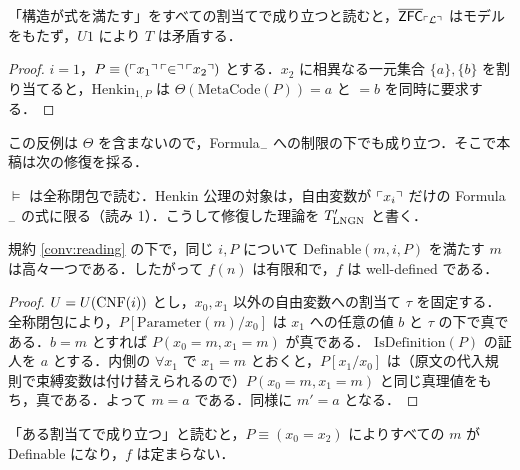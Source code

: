 \begin{proposition}\label{prop:henkin}
「構造が式を満たす」をすべての割当てで成り立つと読むと，$\overline{\mathsf{ZFC}}_{\ulcorner\mathcal{L}\urcorner}$ はモデルをもたず，$U1$ により $T$ は矛盾する．
\end{proposition}
\begin{proof}
$i=1$，$P\equiv(\ulcorner x_1\urcorner\,\ulcorner \in\urcorner\,\ulcorner x_2\urcorner)$ とする．$x_2$ に相異なる一元集合 $\{a\},\{b\}$ を割り当てると，$\mathrm{Henkin}_{1,P}$ は $\Theta(\mathrm{MetaCode}(P))=a$ と $=b$ を同時に要求する．
\end{proof}

この反例は $\Theta$ を含まないので，Formula$_-$ への制限の下でも成り立つ．そこで本稿は次の修復を採る．
\begin{convention}\label{conv:reading}
$\models$ は全称閉包で読む．Henkin 公理の対象は，自由変数が $\ulcorner x_i\urcorner$ だけの Formula$_-$ の式に限る（読み 1）．こうして修復した理論を $T'_{\mathrm{LNGN}}$ と書く．
\end{convention}

\begin{proposition}
規約 \ref{conv:reading} の下で，同じ $i,P$ について $\mathrm{Definable}(m,i,P)$ を満たす $m$ は高々一つである．したがって $f(n)$ は有限和で，$f$ は well-defined である．
\end{proposition}
\begin{proof}
$U=U(\mathrm{CNF}(i))$ とし，$x_0,x_1$ 以外の自由変数への割当て $\tau$ を固定する．
全称閉包により，$P[\mathrm{Parameter}(m)/x_0]$ は $x_1$ への任意の値 $b$ と $\tau$ の下で真である．$b=m$ とすれば $P(x_0{=}m,x_1{=}m)$ が真である．
$\mathrm{IsDefinition}(P)$ の証人を $a$ とする．内側の $\forall x_1$ で $x_1=m$ とおくと，$P[x_1/x_0]$ は（原文の代入規則で束縛変数は付け替えられるので）$P(x_0{=}m,x_1{=}m)$ と同じ真理値をもち，真である．よって $m=a$ である．同様に $m'=a$ となる．
\end{proof}

「ある割当てで成り立つ」と読むと，$P\equiv(x_0=x_2)$ によりすべての $m$ が Definable になり，$f$ は定まらない．

